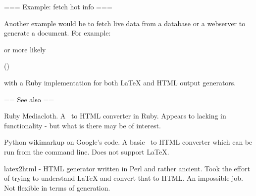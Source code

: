=== Example: fetch hot info ===

Another example would be to fetch live data from a database or a
webserver to generate a document. For example:


or more likely

  \userinfo(\username)

with a Ruby implementation for both LaTeX and HTML output generators.


== See also ==

Ruby Mediacloth. A \mediawiki\ to HTML converter in Ruby. Appears to
lacking in functionality - but what is there may be of interest.

Python wikimarkup on Google's code. A basic \mediawiki\ to HTML
converter which can be run from the command line. Does not support
LaTeX.

latex2html - HTML generator written in Perl and rather ancient. Took
the effort of trying to understand LaTeX and convert that to HTML. An
impossible job. Not flexible in terms of generation.
